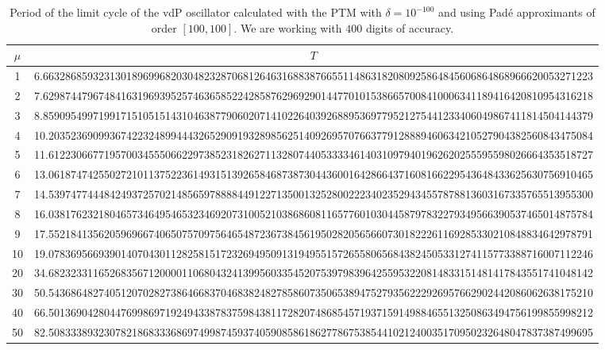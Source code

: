 \documentclass[final]{article}
\begin{document}
\begin{table}
	\caption{Period of the limit cycle of the vdP oscillator calculated with the PTM with $\delta=10^{-100}$ and using Pad\'e approximants of order $[100,100]$. We are working with $400$ digits of accuracy. }
	\bigskip
	\label{table_T_vdP}
	\begin{tabular}{|c|c|}
		\hline
		$\mu$ &   $T$    \\
		\hline
		1   &  6.663286859323130189699682030482328706812646316883876655114863182080925864845606864868966620053271223 \\
		2   &  7.629874479674841631969395257463658522428587629692901447701015386657008410006341189416420810954316218 \\
		3   &  8.859095499719917151051514310463877906020714102264039268895369779521275441233406049867411814504144379 \\
		4   & 10.20352369099367422324899444326529091932898562514092695707663779128889460634210527904382560843475084  \\
		5   & 11.61223066771957003455506622973852318262711328074405333346140310979401962620255595598026664353518727  \\
		6   & 13.06187474255027210113752236149315139265846873873044360016428664371608166229543648433625630756910465  \\
		7   & 14.53974774448424937257021485659788884491227135001325280022234023529434557878813603167335765513955300  \\
		8   & 16.03817623218046573464954653234692073100521038686081165776010304458797832279349566390537465014875784  \\
		9   & 17.55218413562059696674065075709756465487236738456195028205656607301822261169285330210848834642978791  \\
		10  & 19.07836956693901407043011282581517232694950913194955157265580656843824505331274115773388716007112246  \\
		20  & 34.68232331165268356712000011068043241399560335452075397983964255953220814833151481417843551741048142  \\
		30  & 50.54368648274051207028273864668370468382482785860735065389475279356222926957662902442086062638175210  \\
		40  & 66.50136904280447699869719249433878375984381172820748685457193715914988465513250863494756199855998212  \\
		50  & 82.50833389323078218683336869749987459374059085861862778675385441021240035170950232648047837387499695  \\ 

\end{tabular}
\end{table}
\end{document}
